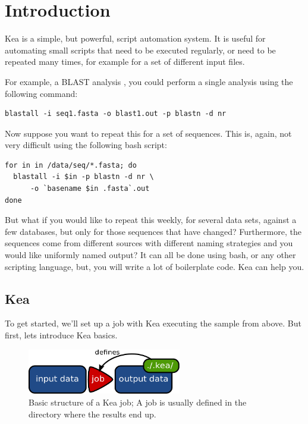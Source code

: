 \chapter{Introduction}

Kea is a simple, but powerful, script automation system. It is useful
for automating small scripts that need to be executed regularly, or
need to be repeated many times, for example for a set of different
input files.

For example, a BLAST analysis \citep{Altschul1990}, you could perform
a single analysis using the following command:

\begin{lstlisting}
blastall -i seq1.fasta -o blast1.out -p blastn -d nr
\end{lstlisting}

Now suppose you want to repeat this for a set of sequences. This is,
again, not very difficult using the following bash script:

\begin{lstlisting}
for in in /data/seq/*.fasta; do
  blastall -i $in -p blastn -d nr \
      -o `basename $in .fasta`.out
done
\end{lstlisting}

But what if you would like to repeat this weekly, for several data
sets, against a few databases, but only for those sequences that have
changed? Furthermore, the sequences come from different sources with
different naming strategies and you would like uniformly named output?
It can all be done using bash, or any other scripting language, but,
you will write a lot of boilerplate code. Kea can help you.

\section{Kea}

To get started, we'll set up a job with Kea executing the sample from
above. But first, lets introduce Kea basics.

\begin{figure}[h]
  \begin{center}
    \includegraphics[width=0.6\textwidth]{kea_intro_1.pdf}
  \end{center}
  \caption{Basic structure of a Kea job; A job is usually defined in
    the directory where the results end up.}
  \label{f_intro_1}
\end{figure}

